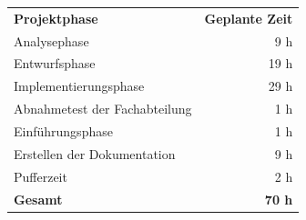 \begin{tabular}{lr}
\rowcolor{heading}\textbf{Projektphase} & \textbf{Geplante Zeit} \\
Analysephase & 9 h \\
\rowcolor{odd}Entwurfsphase & 19 h \\
Implementierungsphase & 29 h \\
\rowcolor{odd}Abnahmetest der Fachabteilung & 1 h \\
Einführungsphase & 1 h \\
\rowcolor{odd}Erstellen der Dokumentation & 9 h \\
Pufferzeit & 2 h \\
\hline
\hline
\rowcolor{odd}\textbf{Gesamt} & \textbf{70 h} \\
\end{tabular}
